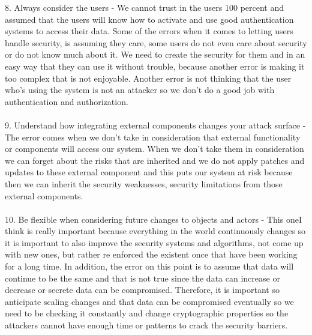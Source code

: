 \documentclass[12pt]{article}
\begin{document}
\begin{description}
8. Always consider the users - We cannot trust in the users 100 percent and assumed that the users will know how to activate and use good authentication systems to access their data. Some of the errors when it comes to letting users handle security, is assuming they care, some users do not even care about security or do not know much about it. We need to create the security for them and in an easy way that they can use it without trouble, because another error is making it too complex that is not enjoyable. Another error is not thinking that the user who's using the system is not an attacker so we don't do a good job with authentication and authorization.  \\\\

9. Understand how integrating external components changes your attack surface - The error comes when we don't take in consideration that external functionality or components will access our system. When we don't take them in consideration we can forget about the risks that are inherited and we do not apply patches and updates to these external component and this puts our system at risk because then we can inherit the security weaknesses, security limitations from those external components.  \\\\

10. Be flexible when considering future changes to objects and actors - This oneI think is really important because everything in the world continuously changes so it is important to also improve the security systems and algorithms, not come up with new ones, but rather re enforced the existent once that have been working for a long time. In addition, the error on this point is to assume that data will continue to be the same and that is not true since the data can increase or decrease or secrete data can be compromised. Therefore, it is important so anticipate scaling changes and that data can be compromised eventually so we need to be checking it constantly and change cryptographic properties so the attackers cannot have enough time or patterns to crack the security barriers. 



\end{description}
\end{document}
